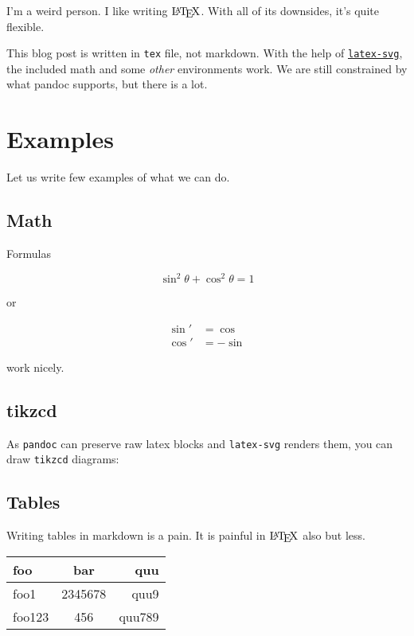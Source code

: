 


I'm a weird person.
I like writing $\text{\LaTeX}$. With all of its downsides, it's quite flexible.

This blog post is written in \texttt{tex} file, not markdown.
With the help of \href{https://oleg.fi/gists/posts/2020-03-06-latex-svg.html}{\texttt{latex-svg}},
the included math and some \emph{other} environments work.
We are still constrained by what pandoc supports, but there is a lot.

\section{Examples}

Let us write few examples of what we can do.

\subsection{Math}

Formulas

\begin{equation*}
\sin^2 \theta + \cos^2 \theta = 1
\end{equation*}

or

\begin{align*}
\sin' &= \cos \\
\cos' &= - \sin
\end{align*}

work nicely.

\subsection{tikzcd}

As \texttt{pandoc} can preserve raw latex blocks and \texttt{latex-svg}
renders them, you can draw \texttt{tikzcd} diagrams:


\subsection{Tables}

Writing tables in markdown is a pain. It is painful in $\text{\LaTeX}$ also but less.

\begin{tabular}{lcr}
foo & bar & quu \\
\hline
foo1 & 2345678 & quu9 \\
foo123 & 456 & quu789
\end{tabular}

